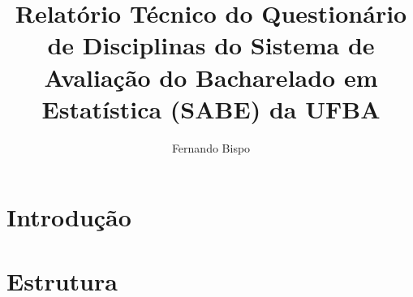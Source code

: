 \documentclass[12pt,a4paper]{article}
\author{Fernando Bispo}
\title{\textbf{Relatório Técnico do Questionário de Disciplinas do Sistema de Avaliação do Bacharelado em Estatística (SABE) da UFBA}}
\date{}
\begin{document}
\maketitle
\section{Introdução}



\begin{comment}

teste de comentário
\end{comment}

















\section{Estrutura}
\end{document}
